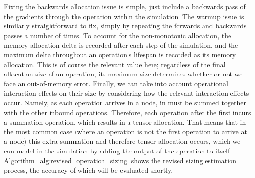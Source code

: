 Fixing the backwards allocation issue is simple, just include a backwards pass of the gradients through the operation
within the simulation. The warmup issue is similarly straightforward to fix, simply by
repeating the forwards and backwards passes a number of times. To account for the non-monotonic allocation, the memory
allocation delta is recorded after each step of the simulation, and the maximum delta throughout an operation's lifespan
is recorded as its memory allocation. This is of course the relevant value here; regardless of the final allocation size
of an operation, its maximum size determines whether or not we face an out-of-memory error. Finally, we can take into account
operational interaction effects on their size by considering how the relevant interaction effects occur. Namely, as each
operation arrives in a node, in must be summed together with the other inbound operations. Therefore, each operation
after the first incurs a summation operation, which results in a tensor allocation. That means that in the most
common case (where an operation is not the first operation to arrive at a node) this extra summation and therefore
tensor allocation occurs,
which we can model in the simulation by adding the output of the operation to itself. Algorithm~\ref{alg:revised_operation_sizing}
shows the revised sizing estimation process, the accuracy of which will be evaluated shortly.

